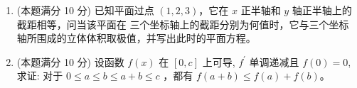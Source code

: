 \begin{enumerate}



\item 
(本题满分 10 分)
已知平面过点 $ (1,2,3) $，它在 $ x $ 正半轴和 $ y $ 轴正半轴上的截距相等，问当该平面在
三个坐标轴上的截距分别为何值时，它与三个坐标轴所围成的立体体积取极值，并写出此时的平面方程。






\item 
(本题满分 10 分)
设函数 $f(x)$ 在 $[0, c]$ 上可导, $f^{\prime}$ 单调递减且 $f(0)=0$, 求证: 对于 $0 \leqslant a \leqslant b \leqslant a+b \leqslant c$ ，都有 $f(a+b) \leqslant f(a)+f(b)$。





\end{enumerate}


